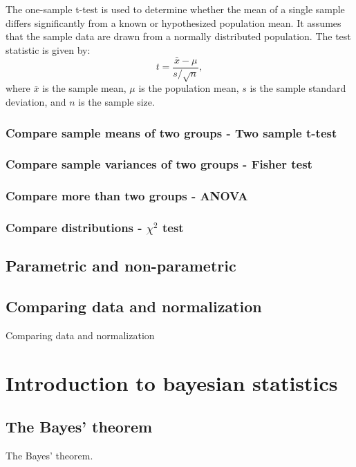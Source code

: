 \documentclass{book}
\begin{document}
The one-sample t-test is used to determine whether the mean of a single sample differs significantly from a known or hypothesized population mean. It assumes that the sample data are drawn from a normally distributed population. The test statistic is given by:
\[
    t = \frac{\bar{x} - \mu}{s / \sqrt{n}},
\]
where $\bar{x}$ is the sample mean, $\mu$ is the population mean, $s$ is the sample standard deviation, and $n$ is the sample size.
\newpage

\subsection*{Compare sample means of two groups - Two sample t-test}

\subsection*{Compare sample variances of two groups - Fisher test}

\subsection*{Compare more than two groups - ANOVA}

\subsection*{Compare distributions - $\chi^{2}$ test}

\section{Parametric and non-parametric}

\section{Comparing data and normalization}
Comparing data and normalization

\chapter{Introduction to bayesian statistics}

\section{The Bayes' theorem}
The Bayes' theorem.
\end{document}
